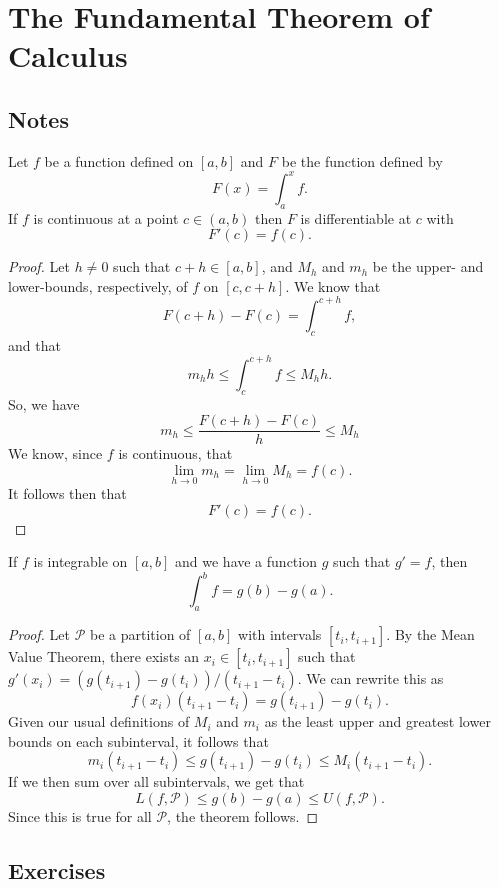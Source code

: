 \section{The Fundamental Theorem of Calculus}

\subsection{Notes}
\begin{theorem} \label{ftc1}
Let $f$ be a function defined on $[a, b]$ and $F$ be the function defined by
\[ F(x) = \int_a^x f. \]
If $f$ is continuous at a point $c \in (a, b)$ then $F$ is differentiable at $c$ with
\[ F'(c) = f(c). \]
\begin{proof}
Let $h \ne 0$ such that $c + h \in [a, b]$, and $M_h$ and $m_h$ be the upper- and lower-bounds, respectively, of $f$ on $[c, c+h]$. We know that 
\[ F(c+h)-F(c) = \int_c^{c+h} f, \]
and that
\[ m_hh \le \int_c^{c+h} f \le M_hh. \]
So, we have
\[ m_h \le \frac{F(c+h)-F(c)}h \le M_h \]
We know, since $f$ is continuous, that
\[ \lim_{h\to0} m_h = \lim_{h\to0}M_h = f(c). \]
It follows then that
\[ F'(c) = f(c). \]
\end{proof}
\end{theorem}

\begin{theorem} \label{ftc2}
If $f$ is integrable on $[a, b]$ and we have a function $g$ such that $g' = f$, then
\[ \int_a^b f = g(b) - g(a). \]
\begin{proof}
Let $\mathscr{P}$ be a partition of $[a, b]$ with intervals $[t_i, t_{i+1}]$. By the Mean Value Theorem, there exists an $x_i \in [t_i, t_{i+1}]$ such that $g'(x_i) = (g(t_{i+1})-g(t_i))/(t_{i+1}-t_i)$. We can rewrite this as
\[ f(x_i)(t_{i+1}-t_i) = g(t_{i+1})-g(t_i). \]
Given our usual definitions of $M_i$ and $m_i$ as the least upper and greatest lower bounds on each subinterval, it follows that
\[ m_i(t_{i+1}-t_i) \le g(t_{i+1})-g(t_i) \le M_i(t_{i+1}-t_i) .\]
If we then sum over all subintervals, we get that
\[ L(f, \mathscr{P}) \le g(b) - g(a) \le U(f, \mathscr{P}). \]
Since this is true for all $\mathscr{P}$, the theorem follows.
\end{proof}
\end{theorem}

\subsection{Exercises}

